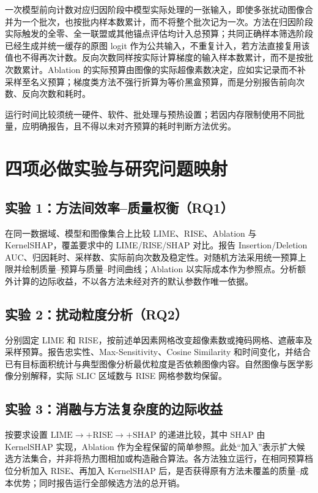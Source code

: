 一次模型前向计数对应归因阶段中模型实际处理的一张输入，即使多张扰动图像合并为一个批次，也按批内样本数累计，而不将整个批次记为一次。方法在归因阶段实际触发的全零、全一联盟或其他锚点评估均计入总预算；共同正确样本筛选阶段已经生成并统一缓存的原图 logit 作为公共输入，不重复计入，若方法直接复用该值也不得再次计数。反向次数同样按实际计算梯度的输入样本数累计，而不是按批次数累计。Ablation 的实际预算由图像的实际超像素数决定，应如实记录而不补采样至名义预算；梯度类方法不强行折算为等价黑盒预算，而是分别报告前向次数、反向次数和耗时。

运行时间比较须统一硬件、软件、批处理与预热设置；若因内存限制使用不同批量，应明确报告，且不得以未对齐预算的耗时判断方法优劣。

\section{四项必做实验与研究问题映射}

\subsection{实验 1：方法间效率--质量权衡（RQ1）}

在同一数据域、模型和图像集合上比较 LIME、RISE、Ablation 与 KernelSHAP，覆盖要求中的 LIME/RISE/SHAP 对比。报告 Insertion/Deletion AUC、归因耗时、采样数、实际前向次数及稳定性。对随机方法采用统一预算上限并绘制质量--预算与质量--时间曲线；Ablation 以实际成本作为参照点。分析额外计算的边际收益，不以各方法未经对齐的默认参数作唯一依据。

\subsection{实验 2：扰动粒度分析（RQ2）}

分别固定 LIME 和 RISE，按前述单因素网格改变超像素数或掩码网格、遮蔽率及采样预算。报告忠实性、Max-Sensitivity、Cosine Similarity 和时间变化，并结合已有目标面积统计与典型图像分析最优粒度是否依赖图像内容。自然图像与医学影像分别解释，实际 SLIC 区域数与 RISE 网格参数均保留。

\subsection{实验 3：消融与方法复杂度的边际收益}

按要求设置 $\mathrm{LIME}\rightarrow+\mathrm{RISE}\rightarrow+\mathrm{SHAP}$ 的递进比较，其中 SHAP 由 KernelSHAP 实现，Ablation 作为全程保留的简单参照。此处“加入”表示扩大候选方法集合，并非将热力图相加或构造融合算法。各方法独立运行，在相同预算档位分析加入 RISE、再加入 KernelSHAP 后，是否获得原有方法未覆盖的质量--成本优势；同时报告运行全部候选方法的总开销。

